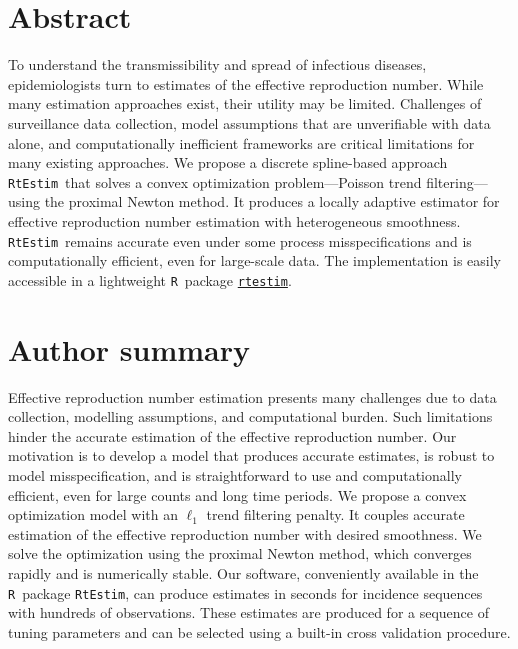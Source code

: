 \documentclass[10pt,letterpaper]{article}
\newcommand{\R}{\texttt{R}}
\def\RtEstim{\texttt{RtEstim}}
\begin{document}
\section*{Abstract}

To understand the transmissibility and spread of infectious diseases,
epidemiologists turn to estimates of the effective reproduction number.
While many estimation approaches exist, their utility may be limited. 
Challenges of surveillance data collection, model assumptions
that are unverifiable with data alone, and 
computationally inefficient frameworks are critical limitations for many
existing approaches. We propose a discrete spline-based approach 
\RtEstim\ that solves a convex optimization problem---Poisson trend filtering---using the proximal Newton method. It produces a locally adaptive 
estimator for effective reproduction number estimation with heterogeneous 
smoothness. \RtEstim\ remains accurate even under some process 
misspecifications and is computationally efficient, even for large-scale 
data. The implementation is easily accessible in a lightweight \R\ 
package \href{https://dajmcdon.github.io/rtestim/index.html}{\texttt{rtestim}}.


\section*{Author summary}

Effective reproduction number estimation presents many challenges due to data
collection, modelling assumptions, and computational burden. Such limitations
hinder the accurate estimation of the effective reproduction number. Our
motivation is to develop a model that produces accurate estimates, is robust to
model misspecification, and is straightforward to use and computationally
efficient, even for large counts and long time periods. We propose a convex
optimization model with an $\ell_1$ trend filtering penalty. It couples accurate
estimation of the effective reproduction number with desired smoothness. We
solve the optimization using the proximal Newton method, which converges rapidly
and is numerically stable. Our software, conveniently available in the \R\
package \RtEstim, can produce estimates in seconds for incidence sequences with
hundreds of observations. These estimates are produced for a sequence of tuning
parameters and can be selected using a built-in cross validation procedure. 
\end{document}
